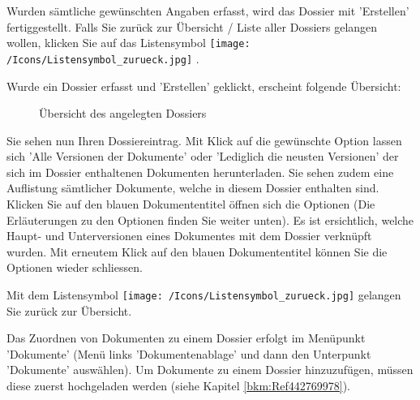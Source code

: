 Wurden sämtliche gewünschten Angaben erfasst, wird das Dossier mit 'Erstellen'  fertiggestellt. Falls Sie zurück zur Übersicht / Liste aller Dossiers gelangen wollen, klicken Sie auf das Listensymbol \texttt{[image: /Icons/Listensymbol\_zurueck.jpg]} .

\vspace{\baselineskip}

Wurde ein Dossier erfasst und 'Erstellen' geklickt, erscheint folgende Übersicht:

\begin{figure}[H]
\caption{Übersicht des angelegten Dossiers}
\end{figure}

Sie sehen nun Ihren Dossiereintrag. Mit Klick auf die gewünschte Option  lassen sich 'Alle Versionen der Dokumente' oder 'Lediglich die neusten Versionen' der sich im Dossier enthaltenen Dokumenten herunterladen. Sie sehen zudem eine Auflistung sämtlicher Dokumente, welche in diesem Dossier enthalten sind. Klicken Sie auf den blauen Dokumententitel  öffnen sich die Optionen (Die Erläuterungen zu den Optionen finden Sie weiter unten). Es ist ersichtlich, welche Haupt- und Unterversionen eines Dokumentes mit dem Dossier verknüpft wurden. Mit erneutem Klick auf den blauen Dokumententitel können Sie die Optionen wieder schliessen.

Mit dem Listensymbol \texttt{[image: /Icons/Listensymbol\_zurueck.jpg]}  gelangen Sie zurück zur Übersicht.

\vspace{\baselineskip}

Das Zuordnen von Dokumenten zu einem Dossier erfolgt im Menüpunkt 'Dokumente' (Menü links 'Dokumentenablage' und dann den Unterpunkt 'Dokumente' auswählen). Um Dokumente zu einem Dossier hinzuzufügen, müssen diese zuerst hochgeladen werden (siehe Kapitel \ref{bkm:Ref442769978}).

